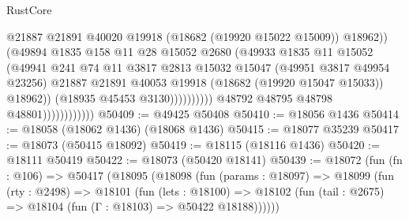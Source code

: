 \begin{lexlean}{RustCore}
\begin{coremodule}
                                                @21887
                                                @21891
                                                @40020
                                                @19918
                                                (@18682 (@19920 @15022 @15009))
                                                @18962))
                                            (@49894
                                              @1835
                                              @158
                                              @11
                                              @28
                                              @15052
                                              @2680
                                              (@49933
                                                @1835
                                                @11
                                                @15052
                                                (@49941
                                                  @241
                                                  @74
                                                  @11
                                                  @3817
                                                  @2813
                                                  @15032
                                                  @15047
                                                  (@49951 @3817 @49954 @23256)
                                                  @21887
                                                  @21891
                                                  @40053
                                                  @19918
                                                  (@18682 (@19920 @15047 @15033))
                                                  @18962))
                                              (@18935 @45453 @3130))))))))))
                            @48792
                            @48795
                            @48798
                            @48801))))))))))))
@50409 := @49425 @50408
@50410 := @18056 @1436
@50414 := @18058 (@18062 @1436) (@18068 @1436)
@50415 := @18077 @35239
@50417 := @18073 (@50415 @18092)
@50419 := @18115 (@18116 @1436)
@50420 := @18111 @50419
@50422 := @18073 (@50420 @18141)
@50439 := @18072
    (fun (fn : @106) =>
    @50417
      (@18095
        (@18098
          (fun (params : @18097) =>
          @18099
            (fun (rty : @2498) =>
            @18101
              (fun (lets : @18100) =>
              @18102 (fun (tail : @2675) => @18104 (fun (Γ : @18103) => @50422 @18188))))))

\end{coremodule}
\end{lexlean}
